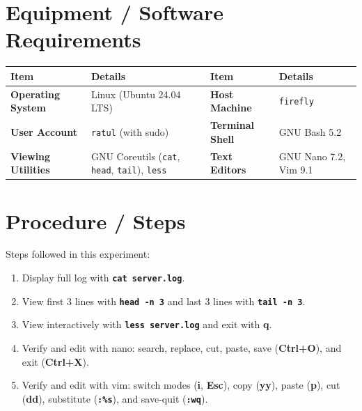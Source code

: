 \documentclass[10pt,a4paper]{article}
\newcommand{\cmd}[1]{\texttt{\textbf{#1}}}
\newcommand{\key}[1]{\textbf{\textcolor{termkey}{#1}}}
\begin{document}
\section{Equipment / Software Requirements}
\vspace{-2pt}
\begin{table}[h!]
\centering\footnotesize
\renewcommand{\arraystretch}{1.08}
\begin{tabularx}{\linewidth}{lXlX}
\toprule
\textbf{Item} & \textbf{Details} & \textbf{Item} & \textbf{Details} \\
\midrule
\textbf{Operating System} & Linux (Ubuntu 24.04 LTS) & \textbf{Host Machine} & \texttt{firefly} \\
\textbf{User Account} & \texttt{ratul} (with sudo) & \textbf{Terminal Shell} & GNU Bash 5.2 \\
\textbf{Viewing Utilities} & GNU Coreutils (\texttt{cat}, \texttt{head}, \texttt{tail}), \texttt{less} & \textbf{Text Editors} & GNU Nano 7.2, Vim 9.1 \\
\bottomrule
\end{tabularx}
\end{table}

\section{Procedure / Steps}
Steps followed in this experiment:
\begin{enumerate}[noitemsep,topsep=1pt,leftmargin=1.4em]
  \item Display full log with \cmd{cat server.log}.
  \item View first 3 lines with \cmd{head -n 3} and last 3 lines with \cmd{tail -n 3}.
  \item View interactively with \cmd{less server.log} and exit with \key{q}.
  \item Verify and edit with nano: search, replace, cut, paste, save (\key{Ctrl+O}), and exit (\key{Ctrl+X}).
  \item Verify and edit with vim: switch modes (\key{i}, \key{Esc}), copy (\key{yy}), paste (\key{p}), cut (\key{dd}), substitute (\cmd{:\%s}), and save-quit (\cmd{:wq}).
\end{enumerate}

\newpage

\end{document}
